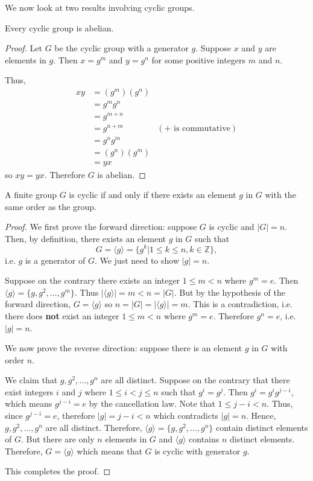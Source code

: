 We now look at two results involving cyclic groups.

\begin{proposition}\label{prop-cyclic-group-is-abelian}
    Every cyclic group is abelian.
\end{proposition}
\begin{proof}
    Let $G$ be the cyclic group with a generator $g$. Suppose $x$ and $y$ are elements in $g$. Then $x = g^m$ and $y = g^n$ for some positive integers $m$ and $n$.

    Thus,
    \begin{align*}
        xy &= (g^m)(g^n)\\
        &= g^mg^n\\
        &= g^{m+n}\\
        &= g^{n+m} & (\text{+ is commutative})\\
        &= g^ng^m\\
        &= (g^n)(g^m)\\
        &= yx
    \end{align*}
    so $xy = yx$. Therefore $G$ is abelian.
\end{proof}

\begin{theorem}\label{thrm-cyclic-group-has-element-with-same-order}
    A finite group $G$ is cyclic if and only if there exists an element $g$ in $G$ with the same order as the group.
\end{theorem}
\begin{proof}
    We first prove the forward direction: suppose $G$ is cyclic and $|G| = n$. Then, by definition, there exists an element $g$ in $G$ such that
    \[
        G = \langle g \rangle = \{g^k \vert 1 \leq k \leq n, k \in \mathbb{Z}\},
    \]
    i.e. $g$ is a generator of $G$. We just need to show $|g| = n$.

    Suppose on the contrary there exists an integer $1 \leq m < n$ where $g^m = e$. Then $\langle g \rangle = \{g, g^2, \dots, g^m\}$. Thus $|\langle g \rangle| = m < n = |G|$. But by the hypothesis of the forward direction, $G = \langle g \rangle$ so $n = |G| = |\langle g \rangle| = m$. This is a contradiction, i.e. there does \textbf{not} exist an integer $1 \leq m < n$ where $g^m = e$. Therefore $g^n = e$, i.e. $|g| = n$.

    We now prove the reverse direction: suppose there is an element $g$ in $G$ with order $n$.
    
    We claim that $g, g^2, \dots, g^n$ are all distinct. Suppose on the contrary that there exist integers $i$ and $j$ where $1 \leq i < j \leq n$ such that $g^i = g^j$. Then $g^i = g^ig^{j-i}$, which means $g^{j-i} = e$ by the cancellation law. Note that $1 \leq j - i < n$. Thus, since $g^{j-i} = e$, therefore $|g| = j - i < n$ which contradicts $|g| = n$. Hence, $g, g^2, \dots, g^n$ are all distinct. Therefore, $\langle g \rangle = \{g, g^2, \dots, g^n\}$ contain distinct elements of $G$. But there are only $n$ elements in $G$ and $\langle g \rangle$ contains $n$ distinct elements. Therefore, $G = \langle g \rangle$ which means that $G$ is cyclic with generator $g$.

    This completes the proof.
\end{proof}

